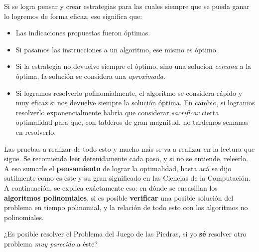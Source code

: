 Si se logra pensar y crear estrategias para las cuales siempre que se pueda ganar lo logremos de forma eficaz, eso significa que:
\begin{itemize}
    \item Las indicaciones propuestas fueron óptimas.
    \item Si pasamos las instrucciones a un algoritmo, ese mismo es óptimo.
    \item Si la estrategia no devuelve siempre el óptimo, sino una solucion \textit{cercana} a la óptima, la solución se considera una \textit{aproximada}.
    \item Si logramos resolverlo polinomialmente, el algoritmo se considera rápido y muy eficaz si nos devuelve siempre la solución óptima. En cambio, si logramos resolverlo exponencialmente habría que considerar \textit{sacrificar} cierta optimalidad para que, con tableros de gran magnitud, no tardemos semanas en resolverlo.
\end{itemize}

Las pruebas a realizar de todo esto y mucho más se va a realizar en la lectura que sigue. Se recomienda leer detenidamente cada paso, y si no se entiende, releerlo. 
A eso sumarle el \textbf{pensamiento} de lograr la optimalidad, hasta acá se dijo sutilmente como es éste y su gran significado en las Ciencias de la Computación. A continuación, se explica exáctamente eso: en dónde se encasillan los \textbf{algoritmos polinomiales}, si es posible \textbf{verificar} una posible solución del problema en tiempo polinomial, y la relación de todo esto con los algoritmos no polinomiales. 

¿Es posible resolver el Problema del Juego de las Piedras, si yo \textbf{sé} resolver otro problema \textit{muy parecido} a éste?

